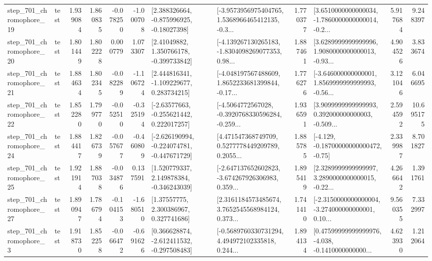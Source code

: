 \begin{tabular}{llrrrrllrlrr}
  step\_701\_chromophore\_19 &      test &      1.939084 &    1.860835 &     -0.078250 & -1.000708 &    [2.388326664, -0.875996925, -0.18027398] &  [-3.9573956975404765, 1.5368966465412135, -0.3... &       1.770377 &  [3.6510000000000034, -1.7860000000000014, -0.2... &            5.917684 &          9.248397 \\
  step\_701\_chromophore\_20 &      test &      1.801449 &    1.802228 &      0.000779 &  1.073307 &     [2.41049882, 1.350766178, -0.399733842] &  [-4.139267130265183, -1.8304098269077353, 0.98... &       1.887461 &  [3.6289999999999996, 1.9080000000000013, -0.93... &            4.904526 &          3.833674 \\
  step\_701\_chromophore\_21 &      test &      1.884634 &    1.802345 &     -0.082289 & -1.106724 &    [2.444816341, -1.109229677, 0.283734215] &  [-4.048197567488609, 1.8652233681399844, -0.17... &       1.776276 &  [-3.646000000000001, 1.8569999999999993, -0.56... &            3.121046 &          6.046695 \\
  step\_701\_chromophore\_22 &      test &      1.852280 &    1.799770 &     -0.052510 & -0.325194 &    [-2.63577663, -0.255621442, 0.222017257] &  [-4.5064772567028, -0.3920768330596284, -0.259... &       1.936591 &  [3.9099999999999993, 0.392000000000003, -0.509... &            2.594592 &         10.695175 \\
  step\_701\_chromophore\_24 &      test &      1.884417 &    1.826739 &     -0.057677 & -0.460809 &  [-2.626190994, -0.224074781, -0.447671729] &  [4.471547368749709, 0.5277778449209789, 0.2055... &       1.885785 &              [-4.129, -0.18700000000000472, -0.75] &            2.339987 &          8.701827 \\
  step\_701\_chromophore\_25 &      test &      1.921914 &    1.887038 &     -0.034876 &  0.137591 &    [1.520779337, 2.149878384, -0.346243039] &  [-2.647137652602823, -3.674267926306983, 0.359... &       1.895419 &  [2.3289999999999997, 3.2890000000000015, -0.22... &            4.266642 &          1.391761 \\
  step\_701\_chromophore\_27 &      test &      1.890947 &    1.786794 &     -0.104153 & -1.680510 &      [1.37557775, 2.300386967, 0.327741686] &  [2.3161184573485674, 3.7652545568984124, 0.373... &       1.741410 &  [-2.3150000000000004, -3.274000000000001, 0.10... &            9.560355 &          7.332997 \\
   step\_701\_chromophore\_3 &      test &      1.918730 &    1.852258 &     -0.066472 & -0.691626 &   [0.366628874, -2.612411532, -0.297508483] &  [-0.5689760330731294, 4.494972102335818, 0.244... &       1.894134 &  [0.47599999999999976, -4.038, -0.1410000000000... &            4.623930 &          1.212064 \\

\end{tabular}
